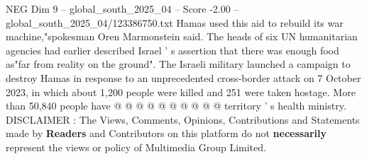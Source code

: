 \begin{textsample}{NEG Dim 9 – global\_south\_2025\_04 – Score -2.00 – global\_south\_2025\_04/123386750.txt}
Hamas used this aid to rebuild its war machine,"spokesman Oren Marmonstein said.
The heads of six UN humanitarian agencies had earlier described Israel ' s assertion that there was enough food as"far from reality on the ground".
The Israeli military launched a campaign to destroy Hamas in response to an unprecedented cross-border attack on 7 October 2023, in which about 1,200 people were killed and 251 were taken hostage.
More than 50,840 people have @ @ @ @ @ @ @ @ @ @ territory ' s health ministry.
DISCLAIMER : The Views, Comments, Opinions, Contributions and Statements made by \textbf{Readers} and Contributors on this platform do not \textbf{necessarily} represent the views or policy of Multimedia Group Limited.

\end{textsample}
